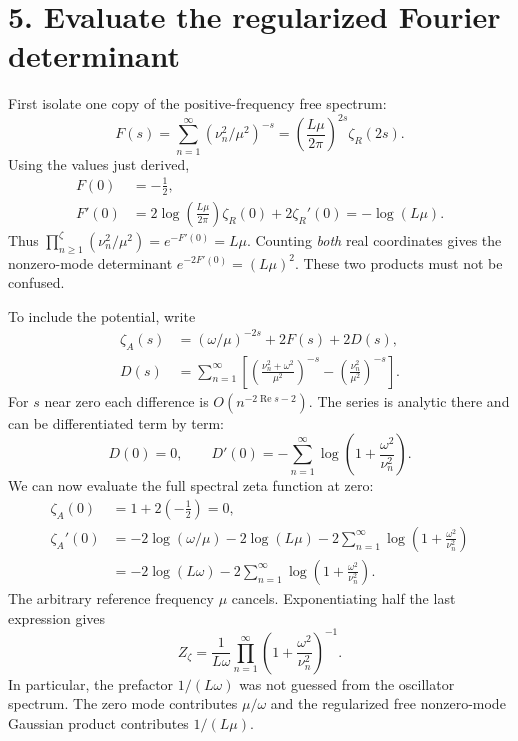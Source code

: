 \documentclass[11pt,letterpaper]{article}
\begin{document}
\section*{5. Evaluate the regularized Fourier determinant}
First isolate one copy of the positive-frequency free spectrum:
\[
 F(s)=\sum_{n=1}^{\infty}(\nu_n^2/\mu^2)^{-s}
 =\left(\frac{L\mu}{2\pi}\right)^{2s}\zeta_R(2s).
\]
Using the values just derived,
\begin{align}
 F(0)&=-\tfrac12,\\
 F'(0)&=2\log\left(\frac{L\mu}{2\pi}\right)\zeta_R(0)
                  +2\zeta_R'(0)=-\log(L\mu).
\end{align}
Thus $\prod_{n\geq1}^{\zeta}(\nu_n^2/\mu^2)=e^{-F'(0)}=L\mu$.
Counting \emph{both} real coordinates gives the nonzero-mode determinant
$e^{-2F'(0)}=(L\mu)^2$. These two products must not be confused.

To include the potential, write
\begin{align}
 \zeta_A(s)&=(\omega/\mu)^{-2s}+2F(s)+2D(s),\\
 D(s)&=\sum_{n=1}^{\infty}
 \left[\left(\frac{\nu_n^2+\omega^2}{\mu^2}\right)^{-s}
       -\left(\frac{\nu_n^2}{\mu^2}\right)^{-s}\right].
\end{align}
For $s$ near zero each difference is $O(n^{-2\operatorname{Re}s-2})$.
The series is analytic there and can be differentiated term by term:
\[
 D(0)=0,\qquad
 D'(0)=-\sum_{n=1}^{\infty}\log\left(1+\frac{\omega^2}{\nu_n^2}\right).
\]
We can now evaluate the full spectral zeta function at zero:
\begin{align}
 \zeta_A(0)&=1+2(-\tfrac12)=0,\\
 \zeta_A'(0)&=-2\log(\omega/\mu)-2\log(L\mu)
       -2\sum_{n=1}^{\infty}\log\left(1+\frac{\omega^2}{\nu_n^2}\right)\\
 &=-2\log(L\omega)
       -2\sum_{n=1}^{\infty}\log\left(1+\frac{\omega^2}{\nu_n^2}\right).
\end{align}
The arbitrary reference frequency $\mu$ cancels. Exponentiating half the
last expression gives
\begin{equation}
 \boxed{Z_\zeta=\frac{1}{L\omega}
 \prod_{n=1}^{\infty}\left(1+\frac{\omega^2}{\nu_n^2}\right)^{-1}.}
 \label{eq:zeta-result}
\end{equation}
In particular, the prefactor $1/(L\omega)$ was not guessed from the oscillator
spectrum. The zero mode contributes $\mu/\omega$ and the regularized free
nonzero-mode Gaussian product contributes $1/(L\mu)$.

\newpage
\end{document}
